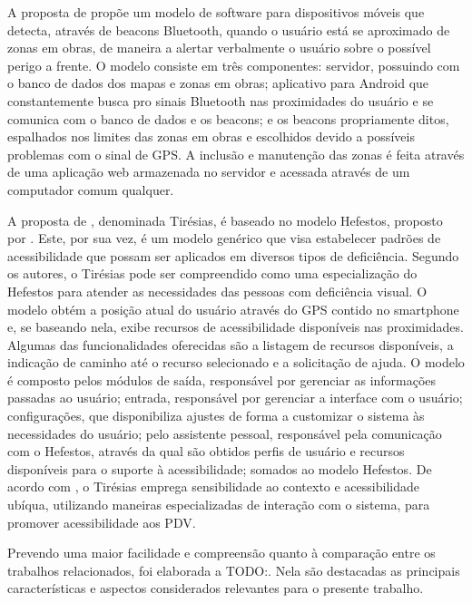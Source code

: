 \documentclass[twoside,english,brazilian]{UNISINOSartigo}
\begin{document}
A proposta de  propõe um modelo de software para dispositivos móveis que detecta, através de beacons Bluetooth, quando o usuário está se aproximado de zonas em obras, de maneira a alertar verbalmente o usuário sobre o possível perigo a frente. O modelo consiste em três componentes: servidor, possuindo com o banco de dados dos mapas e zonas em obras; aplicativo para Android que constantemente busca pro sinais Bluetooth nas proximidades do usuário e se comunica com o banco de dados e os beacons; e os beacons propriamente ditos, espalhados nos limites das zonas em obras e escolhidos devido a possíveis problemas com o sinal de GPS. A inclusão e manutenção das zonas é feita através de uma aplicação web armazenada no servidor e acessada através de um computador comum qualquer.

A proposta de , denominada Tirésias, é baseado no modelo Hefestos, proposto por . Este, por sua vez, é um modelo genérico que visa estabelecer padrões de acessibilidade que possam ser aplicados em diversos tipos de deficiência. Segundo os autores, o Tirésias pode ser compreendido como uma especialização do Hefestos para atender as necessidades das pessoas com deficiência visual. O modelo obtém a posição atual do usuário através do GPS contido no smartphone e, se baseando nela, exibe recursos de acessibilidade disponíveis nas proximidades. Algumas das funcionalidades oferecidas são a listagem de recursos disponíveis, a indicação de caminho até o recurso selecionado e a solicitação de ajuda. O modelo é composto pelos módulos de saída, responsável por gerenciar as informações passadas ao usuário; entrada, responsável por gerenciar a interface com o usuário; configurações, que disponibiliza ajustes de forma a customizar o sistema às necessidades do usuário; pelo assistente pessoal, responsável pela comunicação com o Hefestos, através da qual são obtidos perfis de usuário e recursos disponíveis para o suporte à acessibilidade; somados ao modelo Hefestos. De acordo com , o Tirésias emprega sensibilidade ao contexto e acessibilidade ubíqua, utilizando maneiras especializadas de interação com o sistema, para promover acessibilidade aos PDV.





Prevendo uma maior facilidade e compreensão quanto à comparação entre os trabalhos relacionados, foi elaborada a TODO:. Nela são destacadas as principais características e aspectos considerados relevantes para o presente trabalho.
\end{document}

